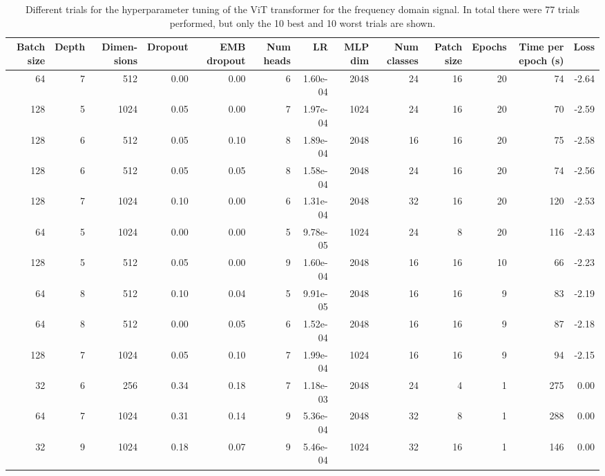 \begin{appendices}
\begin{table}
\caption{Different trials for the hyperparameter tuning of the ViT transformer for the frequency domain signal. In total there were 77 trials performed, but only the 10 best and 10 worst trials are shown.}
\label{tab:hyperparams_vit_f}
\begin{tabular}{rrrrrrrrrrrrr}
\toprule
\multicolumn{1}{p{0.5cm}}{\raggedleft Batch size} & 
\multicolumn{1}{p{0.5cm}}{\raggedleft Depth} & 
\multicolumn{1}{p{1.0cm}}{\raggedleft Dimen-sions} & 
\multicolumn{1}{p{1.0cm}}{\raggedleft Dropout} & 
\multicolumn{1}{p{1.0cm}}{\raggedleft EMB dropout} & 
\multicolumn{1}{p{1.0cm}}{\raggedleft Num heads} & 
\multicolumn{1}{p{0.5cm}}{\raggedleft LR} & 
\multicolumn{1}{p{0.5cm}}{\raggedleft MLP dim} & 
\multicolumn{1}{p{1.0cm}}{\raggedleft Num classes} & 
\multicolumn{1}{p{1.0cm}}{\raggedleft Patch size} & 
\multicolumn{1}{p{1.0cm}}{\raggedleft Epochs} & 
\multicolumn{1}{p{1.5cm}}{\raggedleft Time per epoch (s)} & 
\multicolumn{1}{p{0.5cm}}{\raggedleft Loss} \\
\midrule
64 & 7 & 512 & 0.00 & 0.00 & 6 & 1.60e-04 & 2048 & 24 & 16 & 20 & 74 & -2.64 \\
128 & 5 & 1024 & 0.05 & 0.00 & 7 & 1.97e-04 & 1024 & 24 & 16 & 20 & 70 & -2.59 \\
128 & 6 & 512 & 0.05 & 0.10 & 8 & 1.89e-04 & 2048 & 16 & 16 & 20 & 75 & -2.58 \\
128 & 6 & 512 & 0.05 & 0.05 & 8 & 1.58e-04 & 2048 & 24 & 16 & 20 & 74 & -2.56 \\
128 & 7 & 1024 & 0.10 & 0.00 & 6 & 1.31e-04 & 2048 & 32 & 16 & 20 & 120 & -2.53 \\
64 & 5 & 1024 & 0.00 & 0.00 & 5 & 9.78e-05 & 1024 & 24 & 8 & 20 & 116 & -2.43 \\
128 & 5 & 512 & 0.05 & 0.00 & 9 & 1.60e-04 & 2048 & 16 & 16 & 10 & 66 & -2.23 \\
64 & 8 & 512 & 0.10 & 0.04 & 5 & 9.91e-05 & 2048 & 16 & 16 & 9 & 83 & -2.19 \\
64 & 8 & 512 & 0.00 & 0.05 & 6 & 1.52e-04 & 2048 & 16 & 16 & 9 & 87 & -2.18 \\
128 & 7 & 1024 & 0.05 & 0.10 & 7 & 1.99e-04 & 1024 & 16 & 16 & 9 & 94 & -2.15 \\
\midrule
32 & 6 & 256 & 0.34 & 0.18 & 7 & 1.18e-03 & 2048 & 24 & 4 & 1 & 275 & 0.00 \\
64 & 7 & 1024 & 0.31 & 0.14 & 9 & 5.36e-04 & 2048 & 32 & 8 & 1 & 288 & 0.00 \\
32 & 9 & 1024 & 0.18 & 0.07 & 9 & 5.46e-04 & 1024 & 32 & 16 & 1 & 146 & 0.00 \\

\end{tabular}
\end{table}
\end{appendices}
